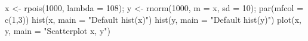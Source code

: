 \begin{Schunk}
\begin{Sinput}
 x <- rpois(1000, lambda = 108);
 y <- rnorm(1000, m = x, sd = 10);
 par(mfcol = c(1,3))
 hist(x, main = "Default hist(x)")
 hist(y, main = "Default hist(y)")
 plot(x, y, main = "Scatterplot x, y")
\end{Sinput}
\end{Schunk}

